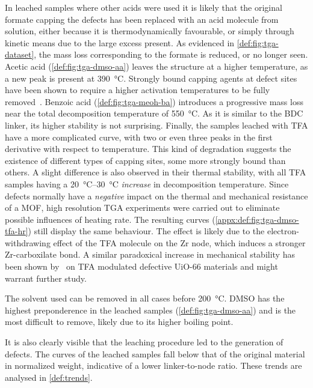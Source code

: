 In leached samples where other acids were used
it is likely that the original formate capping the defects 
has been replaced with an acid molecule from solution,
either because it is thermodynamically favourable, or simply through 
kinetic means due to the large excess present.
As evidenced in \autoref{def:fig:tga-dataset}, the mass 
loss corresponding to the formate is reduced, or no longer seen. 
Acetic acid (\autoref{def:fig:tga-dmso-aa}) leaves the 
structure at a higher temperature, as
a new peak is present at \SI{390}{\degreeCelsius}. Strongly
bound capping agents at defect sites have been shown to 
require a higher activation temperatures to be fully
removed~\cite{jiaoHeatTreatmentDefectiveUiO662017}.
Benzoic acid (\autoref{def:fig:tga-meoh-ba}) introduces a progressive 
mass loss near the total decomposition temperature 
of \SI{550}{\degreeCelsius}.
As it is similar to the \gls{BDC} linker, its higher stability
is not surprising. Finally, the samples leached with 
\gls{TFA} have a more complicated curve, with two or even 
three peaks in the first derivative with respect to temperature.
This kind of degradation suggests the existence of different types
of capping sites, some more strongly bound than others.
A slight difference is also observed in their thermal stability,
with all \gls{TFA} samples having a \SIrange{20}{30}{\degreeCelsius}
\textit{increase} in decomposition temperature. Since defects normally
have a \textit{negative} impact on the thermal and mechanical resistance 
of a \gls{MOF}, high resolution \gls{TGA} experiments were carried out
to eliminate possible influences of heating rate. The resulting
curves (\autoref{appx:def:fig:tga-dmso-tfa-hr}) still display 
the same behaviour. The effect is likely due to the
electron-withdrawing effect of the \gls{TFA} molecule on the Zr 
node, which induces a stronger Zr-carboxilate bond. A similar
paradoxical increase in mechanical stability has been shown 
by~\citet{vandevoordeImprovingMechanicalStability2015} on 
\gls{TFA} modulated defective UiO-66 materials and might warrant
further study.

The solvent used can be removed in all cases before 
\SI{200}{\degreeCelsius}. \gls{DMSO} has the highest
preponderence in the leached samples (\autoref{def:fig:tga-dmso-aa}) 
and is the most difficult to remove, likely due to its higher boiling point.

It is also clearly visible that the leaching procedure
led to the generation of defects. The curves 
of the leached samples fall below that of the original material
in normalized weight, indicative of a lower linker-to-node ratio.
These trends are analysed in \autoref{def:trends}.